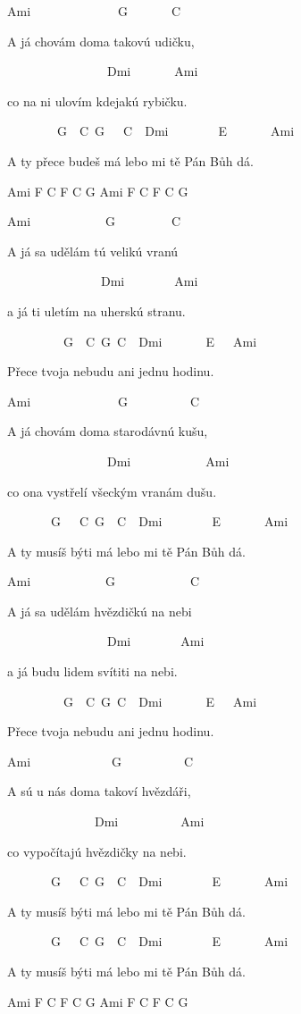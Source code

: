 Ami~~~~~~~~~~~~~~G~~~~~~~C~~~~~

A já chovám doma takovú udičku,

~~~~~~~~~~~~~~~~Dmi~~~~~~~Ami~~~

co na ni ulovím kdejakú rybičku.

~~~~~~~~G~~C~G~~~C~~Dmi~~~~~~~~E~~~~~~~Ami

A ty přece budeš má lebo mi tě Pán Bůh dá.

\bigskip

Ami F C F C G Ami F C F C G 

\bigskip

Ami~~~~~~~~~~~~G~~~~~~~~~C~~~~

A já sa udělám tú velikú vranú

~~~~~~~~~~~~~~~Dmi~~~~~~~~Ami~~~~

a já ti uletím na uherskú stranu.

~~~~~~~~~G~~C~G~C~~Dmi~~~~~~~E~~~Ami

Přece tvoja nebudu ani jednu hodinu.

\bigskip

Ami~~~~~~~~~~~~~~G~~~~~~~~~~C~~~~

A já chovám doma starodávnú kušu,

~~~~~~~~~~~~~~~~Dmi~~~~~~~~~~~~Ami~~

co ona vystřelí všeckým vranám dušu.

~~~~~~~G~~~C~G~~C~~Dmi~~~~~~~~E~~~~~~~Ami

A ty musíš býti má lebo mi tě Pán Bůh dá.

\bigskip

Ami~~~~~~~~~~~~G~~~~~~~~~~~~C~~~

A já sa udělám hvězdičkú na nebi

~~~~~~~~~~~~~~~~Dmi~~~~~~~~Ami~~

a já budu lidem svítiti na nebi.

~~~~~~~~~G~~C~G~C~~Dmi~~~~~~~E~~~Ami

Přece tvoja nebudu ani jednu hodinu.

\bigskip

Ami~~~~~~~~~~~~~G~~~~~~~~~~C~~~~

A sú u nás doma takoví hvězdáři,

~~~~~~~~~~~~~~Dmi~~~~~~~~~~Ami~~

co vypočítajú hvězdičky na nebi.

~~~~~~~G~~~C~G~~C~~Dmi~~~~~~~~E~~~~~~~Ami

A ty musíš býti má lebo mi tě Pán Bůh dá.

~~~~~~~G~~~C~G~~C~~Dmi~~~~~~~~E~~~~~~~Ami

A ty musíš býti má lebo mi tě Pán Bůh dá.

\bigskip

Ami F C F C G Ami F C F C G